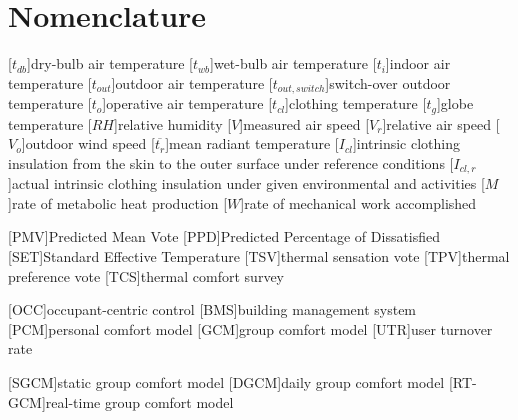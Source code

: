 \documentclass[a4paper,fleqn]{cas-sc}
\begin{document}
\section*{Nomenclature}
\renewcommand{\baselinestretch}{0.75}\normalsize
\renewcommand{\aclabelfont}[1]{\textsc{\acsfont{#1}}}
\begin{acronym}[longest]

    [$t_{db}$]{dry-bulb air temperature}
    [$t_{wb}$]{wet-bulb air temperature}
    [$t_{i}$]{indoor air temperature}
    [$t_{out}$]{outdoor air temperature}
    [$t_{out,switch}$]{switch-over outdoor temperature}
    [$t_{o}$]{operative air temperature}
    [$t_{cl}$]{clothing temperature}
    [$t_{g}$]{globe temperature}
    [$RH$]{relative humidity\acroextra{, \%}}
    [$V$]{measured air speed}
    [$V_{r}$]{relative air speed}
    [$V_{o}$]{outdoor wind speed}
    [$\overline{t_{r}}$]{mean radiant temperature}
    [$I_{cl}$]{intrinsic clothing insulation from the skin to the outer surface under reference conditions}
    [$I_{cl,r}$]{actual intrinsic clothing insulation under given environmental and activities}
    [$M$]{rate of metabolic heat production}
    [$W$]{rate of mechanical work accomplished}
    
    [PMV]{Predicted Mean Vote}
    [PPD]{Predicted Percentage of Dissatisfied\acroextra{, \%}}
    [SET]{Standard Effective Temperature}
    [TSV]{thermal sensation vote}
    [TPV]{thermal preference vote}
    [TCS]{thermal comfort survey}

    [OCC]{occupant-centric control}
    [BMS]{building management system}
    [PCM]{personal comfort model}
    [GCM]{group comfort model}
    [UTR]{user turnover rate}

    [SGCM]{static group comfort model}
    [DGCM]{daily group comfort model}
    [RT-GCM]{real-time group comfort model}

\end{acronym}
\renewcommand{\baselinestretch}{1}\normalsize
\end{document}

